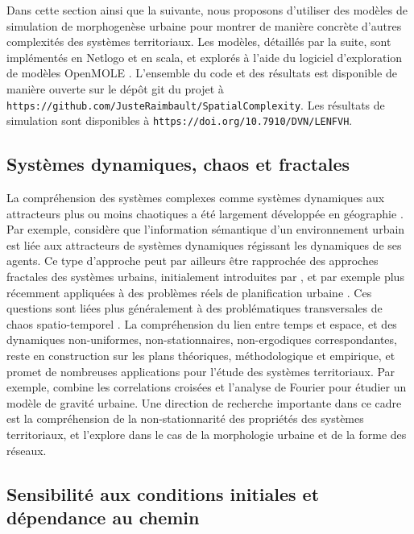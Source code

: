 \documentclass[11pt]{article}
\begin{document}
Dans cette section ainsi que la suivante, nous proposons d'utiliser des modèles de simulation de morphogenèse urbaine pour montrer de manière concrète d'autres complexités des systèmes territoriaux. Les modèles, détaillés par la suite, sont implémentés en Netlogo \cite{wilensky1999netlogo} et en scala, et explorés à l'aide du logiciel d'exploration de modèles OpenMOLE \cite{reuillon2013openmole}. L'ensemble du code et des résultats est disponible de manière ouverte sur le dépôt git du projet à \texttt{https://github.com/JusteRaimbault/SpatialComplexity}. Les résultats de simulation sont disponibles à \texttt{https://doi.org/10.7910/DVN/LENFVH}.


\subsection{Systèmes dynamiques, chaos et fractales}


La compréhension des systèmes complexes comme systèmes dynamiques aux attracteurs plus ou moins chaotiques a été largement développée en géographie \citep{dauphine1995chaos}. Par exemple, \cite{e18060197} considère que l'information sémantique d'un environnement urbain est liée aux attracteurs de systèmes dynamiques régissant les dynamiques de ses agents. Ce type d'approche peut par ailleurs être rapprochée des approches fractales des systèmes urbains, initialement introduites par \cite{batty1994fractal}, et par exemple plus récemment appliquées à des problèmes réels de planification urbaine \citep{yamu2015spatial}. Ces questions sont liées plus généralement à des problématiques transversales de chaos spatio-temporel \citep{crutchfield1987phenomenology}. La compréhension du lien entre temps et espace, et des dynamiques non-uniformes, non-stationnaires, non-ergodiques correspondantes, reste en construction sur les plans théoriques, méthodologique et empirique, et promet de nombreuses applications pour l'étude des systèmes territoriaux. Par exemple,  \cite{chen2009urban} combine les correlations croisées et l'analyse de Fourier pour étudier un modèle de gravité urbaine. Une direction de recherche importante dans ce cadre est la compréhension de la non-stationnarité des propriétés des systèmes territoriaux, et \cite{raimbault2018urban} l'explore dans le cas de la morphologie urbaine et de la forme des réseaux.




\subsection{Sensibilité aux conditions initiales et dépendance au chemin}
\end{document}
